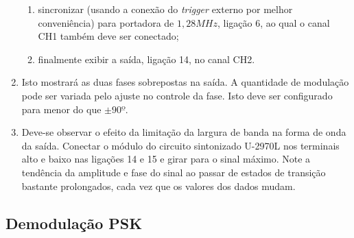 \begin{enumerate}
\begin{enumerate}
		        	\item sincronizar (usando a conexão do \textit{trigger} externo por melhor conveniência) para portadora de $1,28MHz$, ligação 6, ao qual o canal CH1 também deve ser conectado;
		        	
		        	\item finalmente exibir a saída, ligação 14, no canal CH2.
		        \end{enumerate}
			    
	        \item Isto mostrará as duas fases sobrepostas na saída. A quantidade de modulação pode ser variada pelo ajuste no controle da fase. Isto deve ser configurado para menor do que $\pm 90º$.
	        
	        \item Deve-se observar o efeito da limitação da largura de banda na forma de onda da saída. Conectar o módulo do circuito sintonizado U-2970L nos terminais alto e baixo nas ligações 14 e 15 e girar para o sinal máximo. Note a tendência da amplitude e fase do sinal ao passar de estados de transição bastante prolongados, cada vez que os valores dos dados mudam.
        \end{enumerate}
            

            
    \subsection{Demodulação PSK}
                        
